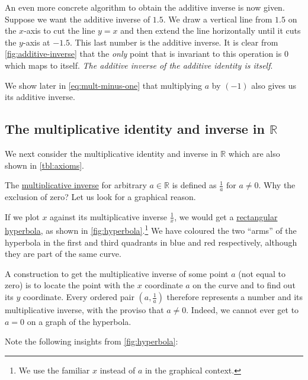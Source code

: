 \documentclass[
  a4paper,
]{article}
\begin{document}
An even more concrete algorithm to obtain the additive inverse is now
given. Suppose we want the additive inverse of \(1.5\). We draw a
vertical line from \(1.5\) on the \(x\)-axis to cut the line \(y = x\)
and then extend the line horizontally until it cuts the \(y\)-axis at
\(-1.5\). This last number is the additive inverse. It is clear from
\cref{fig:additive-inverse} that the \emph{only} point that is invariant
to this operation is \(0\) which maps to itself. \emph{The additive
inverse of the additive identity is itself}.

We show later in \cref{eq:mult-minus-one} that multiplying \(a\) by
\((-1)\) also gives us its additive inverse.

\hypertarget{the-multiplicative-identity-and-inverse-in-mathbbr}{%
\subsection{\texorpdfstring{The multiplicative identity and inverse in
\(\mathbb{R}\)}{The multiplicative identity and inverse in \textbackslash mathbb\{R\}}}\label{the-multiplicative-identity-and-inverse-in-mathbbr}}

We next consider the multiplicative identity and inverse in
\(\mathbb{R}\) which are also shown in \cref{tbl:axioms}.

The
\href{https://mathworld.wolfram.com/MultiplicativeInverse.html}{multiplicative
inverse} for arbitrary \(a \in \mathbb{R}\) is defined as
\(\frac{1}{a} \mbox{ for } a \ne 0\). Why the exclusion of zero? Let us
look for a graphical reason.

If we plot \(x\) against its multiplicative inverse \(\frac{1}{x}\), we
would get a \href{https://en.wikipedia.org/wiki/Hyperbola}{rectangular
hyperbola}, as shown in \cref{fig:hyperbola}.\footnote{We use the
  familiar \(x\) instead of \(a\) in the graphical context.} We have
coloured the two ``arms'' of the hyperbola in the first and third
quadrants in blue and red respectively, although they are part of the
same curve.

A construction to get the multiplicative inverse of some point \(a\)
(not equal to zero) is to locate the point with the \(x\) coordinate
\(a\) on the curve and to find out its \(y\) coordinate. Every ordered
pair \((a, \frac{1}{a})\) therefore represents a number and its
multiplicative inverse, with the proviso that \(a \ne 0\). Indeed, we
cannot ever get to \(a = 0\) on a graph of the hyperbola.

Note the following insights from \cref{fig:hyperbola}:
\end{document}
